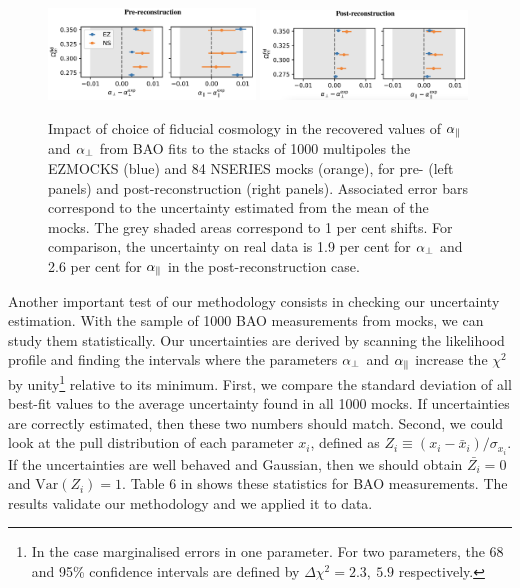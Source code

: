 \begin{figure}
    \centering 
    \includegraphics[width=0.49\textwidth]{fig/galaxies/bao_bias_prerecon.png}
    \includegraphics[width=0.49\textwidth]{fig/galaxies/bao_bias_postrecon.png}
    \caption{Impact of choice of fiducial cosmology in the recovered values
    of ${\alpha_\parallel}$ and ${\alpha_\perp}$ from BAO fits to the stacks of 1000 multipoles the \textsc{EZMOCKS} 
    (blue) and 84 \textsc{NSERIES} mocks (orange), for pre- (left panels) and post-reconstruction
    (right panels). Associated error bars correspond to the uncertainty estimated from 
    the mean of the mocks. The grey shaded areas correspond to 1 per cent shifts. 
    For comparison, the uncertainty on real data is 1.9 per cent for ${\alpha_\perp}$ 
    and 2.6 per cent for ${\alpha_\parallel}$ in the post-reconstruction case.
    }
    \label{fig:bao_bias_mocks}
\end{figure}

Another important test of our methodology consists in checking our uncertainty estimation. 
With the sample of 1000 BAO measurements from mocks, we can study them statistically. 
Our uncertainties are derived by scanning the likelihood profile and finding the intervals
where the parameters ${\alpha_\perp}$ and ${\alpha_\parallel}$ increase the $\chi^2$ by 
unity\footnote{In the case marginalised errors in one parameter. For two parameters, 
the 68 and 95\% confidence intervals are defined by $\Delta \chi^2 = 2.3, \ 5.9$ respectively.} 
relative to its minimum. 
First, we compare the standard deviation of all best-fit values to the average uncertainty
found in all 1000 mocks. If uncertainties are correctly estimated, then these two numbers should 
match. Second, we could look at the pull distribution of each parameter $x_i$, defined as 
$Z_i \equiv (x_i - \bar{x}_i)/\sigma_{x_i}$. If the uncertainties are well behaved and Gaussian, 
then we should obtain $\bar{Z_i}=0$ and $\text{Var}(Z_i) = 1$. 
Table 6 in \cite{bautistaCompletedSDSSIVExtended2021} shows these statistics for BAO measurements. 
The results validate our methodology and we applied it to data.  

